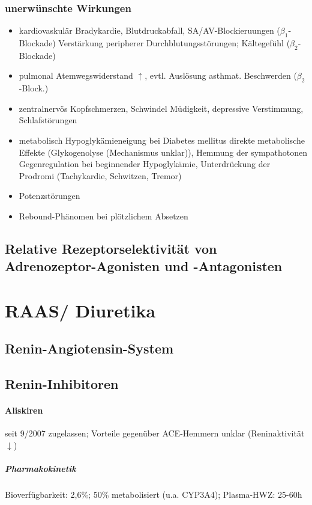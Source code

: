 \documentclass[10pt,a4paper]{report}
\begin{document}
\subsection{unerwünschte Wirkungen}
\begin{itemize}
	\item kardiovaskulär 
	Bradykardie, Blutdruckabfall, SA/AV-Blockieruungen ($\beta_1$-Blockade)
	Verstärkung peripherer Durchblutungsstörungen; Kältegefühl ($\beta_2$-Blockade)
	\item pulmonal 
	Atemwegswiderstand $\uparrow$, evtl. Auslösung asthmat. Beschwerden ($\beta_2$-Block.)
	\item zentralnervös 
	Kopfschmerzen, Schwindel
	Müdigkeit, depressive Verstimmung, Schlafstörungen
	\item metabolisch 
	Hypoglykämieneigung bei Diabetes mellitus 
direkte metabolische Effekte (Glykogenolyse (Mechanismus unklar)), Hemmung der sympathotonen Gegenregulation bei beginnender Hypoglykämie, Unterdrückung der Prodromi (Tachykardie, Schwitzen, Tremor)
	\item Potenzstörungen
	\item Rebound-Phänomen bei plötzlichem Absetzen
\end{itemize}
\section{Relative Rezeptorselektivität von Adrenozeptor-Agonisten und -Antagonisten}
\chapter{RAAS/ Diuretika}
\section{Renin-Angiotensin-System}
\section{Renin-Inhibitoren}
\subsubsection{Aliskiren}seit 9/2007 zugelassen; Vorteile gegenüber ACE-Hemmern unklar (Reninaktivität$\downarrow$)
\paragraph{Pharmakokinetik}Bioverfügbarkeit: 2,6\%; 50\% metabolisiert (u.a. CYP3A4); Plasma-HWZ: 25-60h
\end{document}
